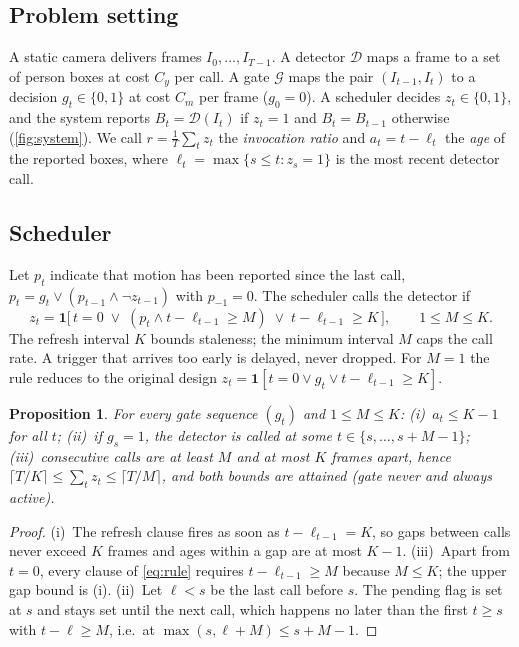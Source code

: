 \documentclass[12pt,a4paper]{article}
\theoremstyle{plain}
\newtheorem{proposition}{Proposition}
\theoremstyle{definition}
\begin{document}
\subsection{Problem setting}\label{sec:setting}
A static camera delivers frames $I_0,\dots,I_{T-1}$. A detector $\mathcal{D}$ maps a frame to a set of person boxes at cost $C_y$ per call. A gate $\mathcal{G}$ maps the pair $(I_{t-1},I_t)$ to a decision $g_t\in\{0,1\}$ at cost $C_m$ per frame ($g_0=0$). A scheduler decides $z_t\in\{0,1\}$, and the system reports $B_t=\mathcal{D}(I_t)$ if $z_t=1$ and $B_t=B_{t-1}$ otherwise (\cref{fig:system}). We call $r=\frac1T\sum_t z_t$ the \emph{invocation ratio} and $a_t=t-\ell_t$ the \emph{age} of the reported boxes, where $\ell_t=\max\{s\le t: z_s=1\}$ is the most recent detector call.

\subsection{Scheduler}\label{sec:scheduler}
Let $p_t$ indicate that motion has been reported since the last call, $p_t=g_t\lor(p_{t-1}\land\lnot z_{t-1})$ with $p_{-1}=0$. The scheduler calls the detector if
\begin{equation}\label{eq:rule}
z_t=\mathbf{1}\bigl[\,t=0\;\lor\;(p_t\land t-\ell_{t-1}\ge M)\;\lor\;t-\ell_{t-1}\ge K\,\bigr],\qquad 1\le M\le K .
\end{equation}
The refresh interval $K$ bounds staleness; the minimum interval $M$ caps the call rate. A trigger that arrives too early is delayed, never dropped. For $M=1$ the rule reduces to the original design $z_t=\mathbf{1}[t=0\lor g_t\lor t-\ell_{t-1}\ge K]$.

\begin{proposition}\label{prop:guarantees}
For every gate sequence $(g_t)$ and $1\le M\le K$:
(i)~$a_t\le K-1$ for all $t$;
(ii)~if $g_s=1$, the detector is called at some $t\in\{s,\dots,s+M-1\}$;
(iii)~consecutive calls are at least $M$ and at most $K$ frames apart, hence $\lceil T/K\rceil\le\sum_t z_t\le\lceil T/M\rceil$, and both bounds are attained (gate never and always active).
\end{proposition}
\begin{proof}
(i)~The refresh clause fires as soon as $t-\ell_{t-1}=K$, so gaps between calls never exceed $K$ frames and ages within a gap are at most $K-1$. (iii)~Apart from $t=0$, every clause of \eqref{eq:rule} requires $t-\ell_{t-1}\ge M$ because $M\le K$; the upper gap bound is (i). (ii)~Let $\ell<s$ be the last call before $s$. The pending flag is set at $s$ and stays set until the next call, which happens no later than the first $t\ge s$ with $t-\ell\ge M$, i.e.\ at $\max(s,\ell+M)\le s+M-1$.
\end{proof}
\end{document}
